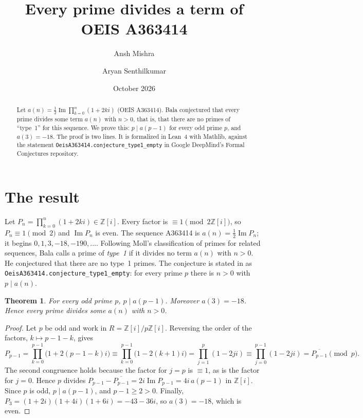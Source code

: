 \documentclass[11pt]{amsart}
\newtheorem{theorem}{Theorem}
\theoremstyle{remark}
\newcommand{\Z}{\mathbb{Z}}
\newcommand{\lean}[1]{\texttt{#1}}
\begin{document}
\title[Every prime divides a term of A363414]{Every prime divides a term of OEIS A363414}

\author{Ansh Mishra}
\author{Aryan Senthilkumar}

\date{October 2026}

\begin{abstract}
Let $a(n)=\frac12\operatorname{Im}\prod_{k=0}^n(1+2ki)$ (OEIS A363414).
Bala conjectured that every prime divides some term $a(n)$ with $n>0$, that is, that there are no primes of ``type~1'' for this sequence.
We prove this: $p\mid a(p-1)$ for every odd prime $p$, and $a(3)=-18$.
The proof is two lines.
It is formalized in Lean~4 with Mathlib, against the statement \lean{OeisA363414.conjecture\_type1\_empty} in Google DeepMind's Formal Conjectures repository.
\end{abstract}

\maketitle

\section{The result}

Let $P_n=\prod_{k=0}^{n}(1+2ki)\in\Z[i]$.
Every factor is $\equiv1\pmod{2\Z[i]}$, so $P_n\equiv1\pmod 2$ and $\operatorname{Im}P_n$ is even.
The sequence A363414 \cite{OEIS} is $a(n)=\frac12\operatorname{Im}P_n$; it begins $0,1,3,-18,-190,\dots$.
Following Moll's classification of primes for related sequences, Bala calls a prime of \emph{type~1} if it divides no term $a(n)$ with $n>0$.
He conjectured that there are no type~1 primes.
The conjecture is stated in \cite{FC} as \lean{OeisA363414.conjecture\_type1\_empty}: for every prime $p$ there is $n>0$ with $p\mid a(n)$.

\begin{theorem}\label{thm}
For every odd prime $p$, $p\mid a(p-1)$.
Moreover $a(3)=-18$.
Hence every prime divides some $a(n)$ with $n>0$.
\end{theorem}

\begin{proof}
Let $p$ be odd and work in $R=\Z[i]/p\Z[i]$.
Reversing the order of the factors, $k\mapsto p-1-k$, gives
\[
P_{p-1}=\prod_{k=0}^{p-1}\bigl(1+2(p-1-k)i\bigr)\equiv\prod_{k=0}^{p-1}\bigl(1-2(k+1)i\bigr)=\prod_{j=1}^{p}(1-2ji)\equiv\prod_{j=0}^{p-1}(1-2ji)=\overline{P_{p-1}}\pmod p .
\]
The second congruence holds because the factor for $j=p$ is $\equiv1$, as is the factor for $j=0$.
Hence $p$ divides $P_{p-1}-\overline{P_{p-1}}=2i\operatorname{Im}P_{p-1}=4i\,a(p-1)$ in $\Z[i]$.
Since $p$ is odd, $p\mid a(p-1)$, and $p-1\ge2>0$.
Finally, $P_3=(1+2i)(1+4i)(1+6i)=-43-36i$, so $a(3)=-18$, which is even.
\end{proof}
\end{document}
